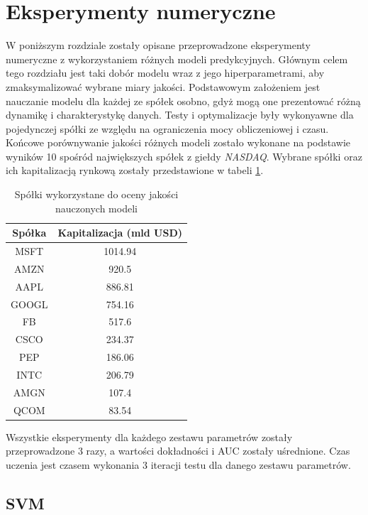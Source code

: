 \documentclass[a4paper, twoside, 11pt, openright]{article}
\begin{document}
\newpage

\section{Eksperymenty numeryczne}

W poniższym rozdziale zostały opisane przeprowadzone eksperymenty numeryczne z wykorzystaniem różnych modeli predykcyjnych. Głównym celem tego rozdziału jest taki dobór modelu wraz z jego hiperparametrami, aby zmaksymalizować wybrane miary jakości. Podstawowym założeniem jest nauczanie modelu dla każdej ze spółek osobno, gdyż mogą one prezentować różną dynamikę i charakterystykę danych. Testy i optymalizacje były wykonyawne dla pojedynczej spółki ze względu na ograniczenia mocy obliczeniowej i czasu. Końcowe porównywanie jakości różnych modeli zostało wykonane na podstawie wyników 10 spośród największych spółek z giełdy \textit{NASDAQ}. Wybrane spółki oraz ich kapitalizacją rynkową zostały przedstawione w tabeli \ref{tab:biggest_companies}.


\begin{table}[H]
    \centering
    \begin{tabular}{|c|c|}
    \hline
        \textbf{Spółka} & \textbf{Kapitalizacja (mld USD)} \\ \hline
        MSFT & 1014.94 \\ \hline 
        AMZN & 920.5 \\ \hline 
        AAPL & 886.81 \\ \hline 
        GOOGL & 754.16 \\ \hline 
        FB & 517.6 \\ \hline 
        CSCO & 234.37 \\ \hline 
        PEP & 186.06 \\ \hline 
        INTC & 206.79 \\ \hline 
        AMGN & 107.4 \\ \hline 
        QCOM & 83.54 \\ \hline 
    \end{tabular}
    \caption{Spółki wykorzystane do oceny jakości nauczonych modeli}
    \label{tab:biggest_companies}
\end{table}

Wszystkie eksperymenty dla każdego zestawu parametrów zostały przeprowadzone 3 razy, a wartości dokładności i AUC zostały uśrednione. Czas uczenia jest czasem wykonania 3 iteracji testu dla danego zestawu parametrów.

\subsection{SVM}
\end{document}
